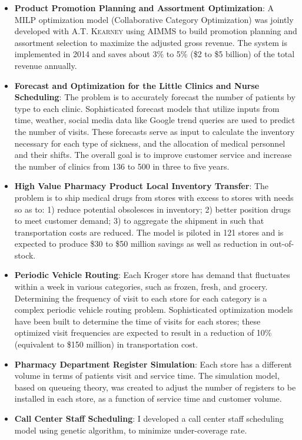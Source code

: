 \documentclass[12pt,a4paper,sans]{moderncv} %
\begin{document}
\begin{itemize}
\item \textbf{Product Promotion Planning and Assortment Optimization}: A MILP optimization model (Collaborative Category Optimization) was
jointly developed with \textsc{A.T. Kearney} using AIMMS to build promotion planning and
assortment selection to maximize the adjusted gross revenue.
The system is implemented in 2014 and saves about 3\% to 5\% (\$2 to \$5 billion) of the total revenue annually.
\item \textbf{Forecast and Optimization for the Little Clinics and Nurse Scheduling}: The problem is
to accurately forecast the number of patients by type to each clinic.
Sophisticated forecast models that utilize inputs from time, weather, social
media data like Google trend queries are used to predict the number of
visits. These forecasts serve as input to calculate the inventory necessary for
each type of sickness, and the allocation of medical personnel and their
shifts. The overall goal is to improve customer service and increase the number
of clinics from 136 to 500 in three to five years.
\item \textbf{High Value Pharmacy Product Local Inventory Transfer}:  The problem is to ship 
medical drugs from stores with excess to stores with needs so as to: 1) reduce
potential obsolesces in inventory; 2) better position drugs to meet customer
demand; 3) to aggregate the shipment in such that transportation costs are
reduced. The model is piloted in 121 stores and is expected
to produce \$30 to \$50 million savings as well as reduction in
out-of-stock.

 \item \textbf{Periodic Vehicle Routing}: Each Kroger store has demand that
 fluctuates within a week in various categories, such as frozen, fresh, and
 grocery. Determining the frequency of visit to each store for each category is
 a complex periodic vehicle routing problem. Sophisticated optimization models
 have been built to determine the time of visits for each stores;  these
 optimized visit frequencies are expected to result in a reduction of 10\%
 (equivalent to \$150 million) in transportation cost.
 \item \textbf{Pharmacy Department Register Simulation}: Each store has a
 different volume in terms of patients visit and service time. The simulation
 model, based on queueing theory, was created to adjust the number of registers to be installed in
 each store, as a function of service time and customer volume.


\item \textbf{Call Center Staff Scheduling}:
I developed a call center staff scheduling model using genetic algorithm, to minimize under-coverage rate.
\end{itemize} 
 
\end{document}
